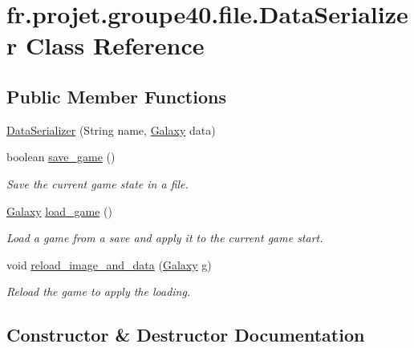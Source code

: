 \hypertarget{classfr_1_1projet_1_1groupe40_1_1file_1_1_data_serializer}{}\section{fr.\+projet.\+groupe40.\+file.\+Data\+Serializer Class Reference}
\label{classfr_1_1projet_1_1groupe40_1_1file_1_1_data_serializer}
\subsection*{Public Member Functions}
\begin{DoxyCompactItemize}
\item 
\hyperlink{classfr_1_1projet_1_1groupe40_1_1file_1_1_data_serializer_a97bec1cc0cab683b7227d60d6b660b97}{Data\+Serializer} (String name, \hyperlink{classfr_1_1projet_1_1groupe40_1_1model_1_1board_1_1_galaxy}{Galaxy} data)
\item 
boolean \hyperlink{classfr_1_1projet_1_1groupe40_1_1file_1_1_data_serializer_a6249fd0a2d17a28b616f90ca4fa27667}{save\+\_\+game} ()
\begin{DoxyCompactList}\small\item\em Save the current game state in a file. \end{DoxyCompactList}\item 
\hyperlink{classfr_1_1projet_1_1groupe40_1_1model_1_1board_1_1_galaxy}{Galaxy} \hyperlink{classfr_1_1projet_1_1groupe40_1_1file_1_1_data_serializer_a1322f0a57e8e2a0269fdf67dab057ec9}{load\+\_\+game} ()
\begin{DoxyCompactList}\small\item\em Load a game from a save and apply it to the current game start. \end{DoxyCompactList}\item 
void \hyperlink{classfr_1_1projet_1_1groupe40_1_1file_1_1_data_serializer_a4e845b4495e2f05bc7ee54a5eb43c7d2}{reload\+\_\+image\+\_\+and\+\_\+data} (\hyperlink{classfr_1_1projet_1_1groupe40_1_1model_1_1board_1_1_galaxy}{Galaxy} g)
\begin{DoxyCompactList}\small\item\em Reload the game to apply the loading. \end{DoxyCompactList}\end{DoxyCompactItemize}


\subsection{Constructor \& Destructor Documentation}
\mbox{\label{classfr_1_1projet_1_1groupe40_1_1file_1_1_data_serializer_a97bec1cc0cab683b7227d60d6b660b97}} 

